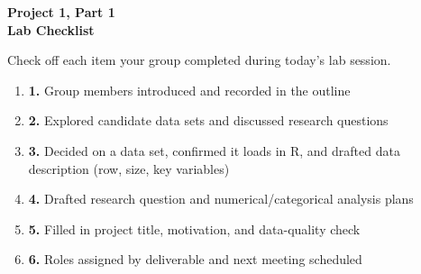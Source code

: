 \documentclass[12pt]{article}
\begin{document}
\begin{center}
\textbf{\Large Project 1, Part 1 \\ Lab Checklist}
\end{center}

\nameBUID


\noindent Check off each item your group completed during today's lab session.
\begin{enumerate}
    \item[$\square$] \textbf{1.} Group members introduced and recorded in the outline
    \item[$\square$] \textbf{2.} Explored candidate data sets and discussed research questions
    \item[$\square$] \textbf{3.} Decided on a data set, confirmed it loads in R, and drafted data description (row, size, key variables)
    \item[$\square$] \textbf{4.} Drafted research question and numerical/categorical analysis plans
    \item[$\square$] \textbf{5.} Filled in project title, motivation, and data-quality check
    \item[$\square$] \textbf{6.} Roles assigned by deliverable and next meeting scheduled
\end{enumerate}
\end{document}

